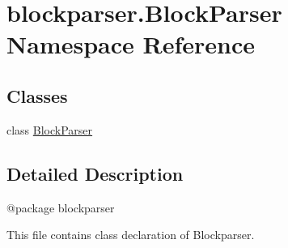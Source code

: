 \hypertarget{namespaceblockparser_1_1BlockParser}{}\section{blockparser.\+Block\+Parser Namespace Reference}
\label{namespaceblockparser_1_1BlockParser}
\subsection*{Classes}
\begin{DoxyCompactItemize}
\item 
class \hyperlink{classblockparser_1_1BlockParser_1_1BlockParser}{Block\+Parser}
\end{DoxyCompactItemize}


\subsection{Detailed Description}
\begin{DoxyVerb}@package blockparser

This file contains class declaration of Blockparser.
\end{DoxyVerb}
 